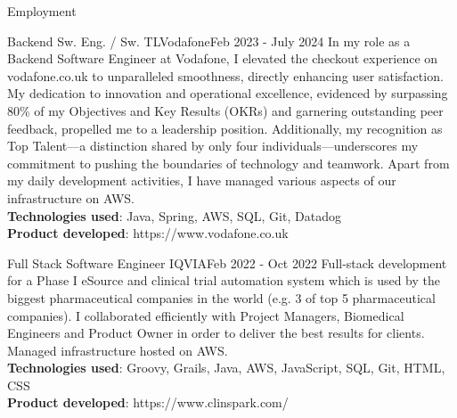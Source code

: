 \documentclass[]{mcdowellcv}
\begin{document}
  \begin{cvsection}{Employment}
		\begin{cvsubsection}{Backend Sw. Eng. / Sw. TL}{Vodafone}{Feb 2023 - July 2024}
			\hspace{\parindent} \hspace{\parindent} \hspace{\parindent} \hspace{\parindent} 
			    In my role as a Backend Software Engineer at Vodafone, I elevated the checkout experience on vodafone.co.uk to unparalleled smoothness, directly enhancing user satisfaction. My dedication to innovation and operational excellence, evidenced by surpassing 80\% of my Objectives and Key Results (OKRs) and garnering outstanding peer feedback, propelled me to a leadership position. Additionally, my recognition as Top Talent—a distinction shared by only four individuals—underscores my commitment to pushing the boundaries of technology and teamwork. Apart from my daily development activities, I have managed various aspects of our infrastructure on AWS.
			\\ \textbf{Technologies used}: Java, Spring, AWS, SQL, Git, Datadog
			\\ \textbf{Product developed}: https://www.vodafone.co.uk
		\end{cvsubsection}

	    \begin{cvsubsection}{Full Stack Software Engineer }{IQVIA}{Feb 2022 - Oct 2022}
			\hspace{\parindent} \hspace{\parindent} \hspace{\parindent} \hspace{\parindent} Full-stack development for a Phase I eSource and clinical trial automation system which is used by the biggest pharmaceutical companies in the world (e.g. 3 of top 5 pharmaceutical companies). I collaborated efficiently with Project Managers, Biomedical Engineers and Product Owner in order to deliver the best results for clients. Managed infrastructure hosted on AWS.
			\\ \textbf{Technologies used}: Groovy, Grails, Java, AWS, JavaScript, SQL, Git, HTML, CSS
			\\ \textbf{Product developed}: https://www.clinspark.com/
		\end{cvsubsection}


\end{cvsection}
\end{document}

